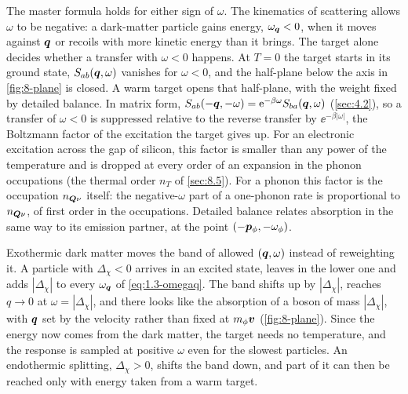 The master formula holds for either sign of $\omega$. The kinematics of scattering allows $\omega$ to be negative: a dark-matter particle gains energy, $\omega_{\bm{q}} < 0$, when it moves against $\bm{q}$ or recoils with more kinetic energy than it brings. The target alone decides whether a transfer with $\omega < 0$ happens. At $T = 0$ the target starts in its ground state, $S_{ab}(\bm{q},\omega)$ vanishes for $\omega < 0$, and the half-plane below the axis in \cref{fig:8-plane} is closed. A warm target opens that half-plane, with the weight fixed by detailed balance. In matrix form, $S_{ab}(-\bm{q},-\omega) = \mathrm{e}^{-\beta\omega}S_{ba}(\bm{q},\omega)$ (\cref{sec:4.2}), so a transfer of $\omega < 0$ is suppressed relative to the reverse transfer by $\ee^{-\beta|\omega|}$, the Boltzmann factor of the excitation the target gives up. For an electronic excitation across the gap of silicon, this factor is smaller than any power of the temperature and is dropped at every order of an expansion in the phonon occupations (the thermal order $n_T$ of \cref{sec:8.5}). For a phonon this factor is the occupation $n_{\bm{Q}\nu}$ itself: the negative-$\omega$ part of a one-phonon rate is proportional to $n_{\bm{Q}\nu}$, of first order in the occupations. Detailed balance relates absorption in the same way to its emission partner, at the point $(-\bm{p}_\phi, -\omega_\phi)$.

Exothermic dark matter moves the band of allowed $(\bm{q}, \omega)$ instead of reweighting it. A particle with $\Delta_\chi < 0$ arrives in an excited state, leaves in the lower one and adds $|\Delta_\chi|$ to every $\omega_{\bm{q}}$ of \cref{eq:1.3-omegaq}. The band shifts up by $|\Delta_\chi|$, reaches $q \to 0$ at $\omega = |\Delta_\chi|$, and there looks like the absorption of a boson of mass $|\Delta_\chi|$, with $\bm{q}$ set by the velocity rather than fixed at $m_\phi\bm{v}$ (\cref{fig:8-plane}). Since the energy now comes from the dark matter, the target needs no temperature, and the response is sampled at positive $\omega$ even for the slowest particles. An endothermic splitting, $\Delta_\chi > 0$, shifts the band down, and part of it can then be reached only with energy taken from a warm target.


